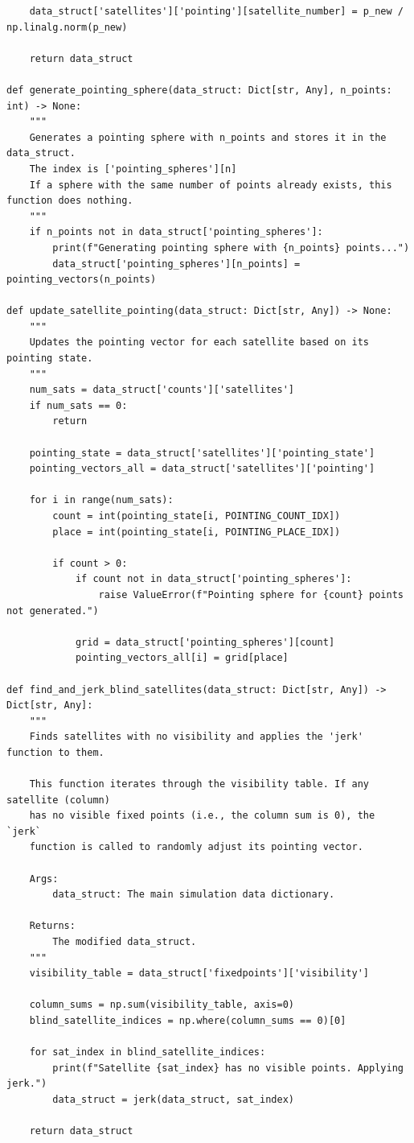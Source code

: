 \documentclass[11pt]{article}
\begin{document}
\begin{Verbatim}
    data_struct['satellites']['pointing'][satellite_number] = p_new / np.linalg.norm(p_new)

    return data_struct

def generate_pointing_sphere(data_struct: Dict[str, Any], n_points: int) -> None:
    """
    Generates a pointing sphere with n_points and stores it in the data_struct.
    The index is ['pointing_spheres'][n]
    If a sphere with the same number of points already exists, this function does nothing.
    """
    if n_points not in data_struct['pointing_spheres']:
        print(f"Generating pointing sphere with {n_points} points...")
        data_struct['pointing_spheres'][n_points] = pointing_vectors(n_points)

def update_satellite_pointing(data_struct: Dict[str, Any]) -> None:
    """
    Updates the pointing vector for each satellite based on its pointing state.
    """
    num_sats = data_struct['counts']['satellites']
    if num_sats == 0:
        return

    pointing_state = data_struct['satellites']['pointing_state']
    pointing_vectors_all = data_struct['satellites']['pointing']

    for i in range(num_sats):
        count = int(pointing_state[i, POINTING_COUNT_IDX])
        place = int(pointing_state[i, POINTING_PLACE_IDX])

        if count > 0:
            if count not in data_struct['pointing_spheres']:
                raise ValueError(f"Pointing sphere for {count} points not generated.")

            grid = data_struct['pointing_spheres'][count]
            pointing_vectors_all[i] = grid[place]

def find_and_jerk_blind_satellites(data_struct: Dict[str, Any]) -> Dict[str, Any]:
    """
    Finds satellites with no visibility and applies the 'jerk' function to them.

    This function iterates through the visibility table. If any satellite (column)
    has no visible fixed points (i.e., the column sum is 0), the `jerk`
    function is called to randomly adjust its pointing vector.

    Args:
        data_struct: The main simulation data dictionary.

    Returns:
        The modified data_struct.
    """
    visibility_table = data_struct['fixedpoints']['visibility']

    column_sums = np.sum(visibility_table, axis=0)
    blind_satellite_indices = np.where(column_sums == 0)[0]

    for sat_index in blind_satellite_indices:
        print(f"Satellite {sat_index} has no visible points. Applying jerk.")
        data_struct = jerk(data_struct, sat_index)

    return data_struct
\end{Verbatim}
\end{document}
